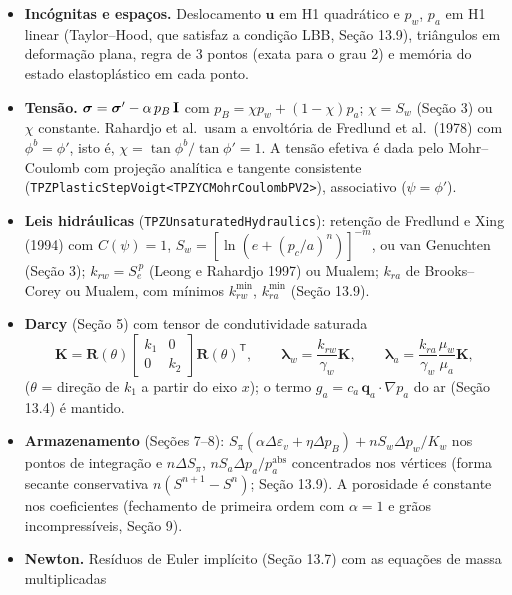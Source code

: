 \begin{itemize}
\item \textbf{Inc\'ognitas e espa\c{c}os.} Deslocamento $\mathbf u$ em H1 quadr\'atico e $p_w$, $p_a$ em H1 linear
(Taylor--Hood, que satisfaz a condi\c{c}\~ao LBB, Se\c{c}\~ao 13.9), tri\^angulos em deforma\c{c}\~ao plana, regra de
3 pontos (exata para o grau 2) e mem\'oria do estado elastopl\'astico em cada ponto.
\item \textbf{Tens\~ao.} $\boldsymbol\sigma=\boldsymbol\sigma'-\alpha\,p_B\,\mathbf I$ com
$p_B=\chi p_w+(1-\chi)p_a$; $\chi=S_w$ (Se\c{c}\~ao 3) ou $\chi$ constante. Rahardjo et al.\ usam a envolt\'oria de
Fredlund et al.\ (1978) com $\phi^b=\phi'$, isto \'e, $\chi=\tan\phi^b/\tan\phi'=1$. A tens\~ao efetiva \'e dada pelo
Mohr--Coulomb com proje\c{c}\~ao anal\'itica e tangente consistente
(\texttt{TPZPlasticStepVoigt<TPZYCMohrCoulombPV2>}), associativo ($\psi=\phi'$).
\item \textbf{Leis hidr\'aulicas} (\texttt{TPZUnsaturatedHydraulics}): reten\c{c}\~ao de Fredlund e Xing (1994) com
$C(\psi)=1$, $S_w=[\ln(e+(p_c/a)^n)]^{-m}$, ou van Genuchten (Se\c{c}\~ao 3); $k_{rw}=S_e^{\,p}$ (Leong e Rahardjo
1997) ou Mualem; $k_{ra}$ de Brooks--Corey ou Mualem, com m\'inimos $k_{rw}^{\min}$, $k_{ra}^{\min}$
(Se\c{c}\~ao 13.9).
\item \textbf{Darcy} (Se\c{c}\~ao 5) com tensor de condutividade saturada
\begin{equation}
\mathbf K=\mathbf R(\theta)\begin{bmatrix}k_1&0\\0&k_2\end{bmatrix}\mathbf R(\theta)^{\mathsf T},\qquad
\boldsymbol\lambda_w=\frac{k_{rw}}{\gamma_w}\mathbf K,\qquad
\boldsymbol\lambda_a=\frac{k_{ra}}{\gamma_w}\frac{\mu_w}{\mu_a}\mathbf K,
\end{equation}
($\theta$ = dire\c{c}\~ao de $k_1$ a partir do eixo $x$); o termo $g_a=c_a\,\mathbf q_a\cdot\nabla p_a$ do ar
(Se\c{c}\~ao 13.4) \'e mantido.
\item \textbf{Armazenamento} (Se\c{c}\~oes 7--8): $S_\pi(\alpha\Delta\varepsilon_v+\eta\Delta p_B)+nS_w\Delta p_w/K_w$
nos pontos de integra\c{c}\~ao e $n\Delta S_\pi$, $nS_a\Delta p_a/p_a^{\mathrm{abs}}$ concentrados nos v\'ertices
(forma secante conservativa $n(S^{n+1}-S^n)$; Se\c{c}\~ao 13.9). A porosidade \'e constante nos coeficientes
(fechamento de primeira ordem com $\alpha=1$ e gr\~aos incompress\'iveis, Se\c{c}\~ao 9).
\item \textbf{Newton.} Res\'iduos de Euler impl\'icito (Se\c{c}\~ao 13.7) com as equa\c{c}\~oes de massa multiplicadas

\end{itemize}
